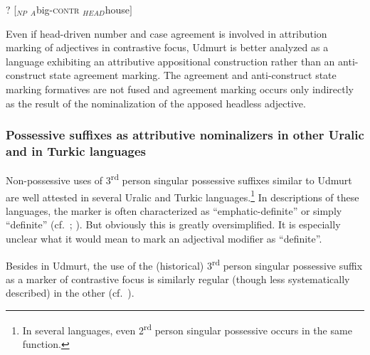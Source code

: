 \begin{exe} \label{udmurt notapposition}
\ex ? [$_{NP}$ $_{A}$big-\textsc{contr} $_{HEAD}$house$]$
\end{exe}
Even if head\hyp{}driven number and case agreement is involved in attribution marking of adjectives in contrastive focus, Udmurt is better analyzed as a language exhibiting an attributive appositional construction rather than an anti-construct state agreement marking. The agreement and anti-construct state marking formatives are not fused and agreement marking occurs only indirectly as the result of the nominalization of the apposed headless adjective.

\subsubsection[Possessive suffixes as attributive nominalizers]{Possessive suffixes as attributive nominalizers in other Uralic and in Turkic languages}
Non-possessive uses of 3\textsuperscript{rd} person singular possessive suffixes similar to Udmurt are well attested in several Uralic and Turkic languages.\footnote{In several languages, even 2\textsuperscript{rd} person singular possessive occurs in the same function.} In descriptions of these languages, the marker is often characterized as “emphatic-definite” or simply “definite” (cf.~\citealt[148]{tauli1966}; \citealt{kunnap2004}). But obviously this is greatly oversimplified. It is especially unclear what it would mean to mark an adjectival modifier as “definite”.

Besides in Udmurt, the use of the (historical) 3\textsuperscript{rd} person singular possessive suffix as a marker of contrastive focus is similarly regular (though less systematically described) in the other  (cf.~\citealt[67]{serebrennikov1963}). %

